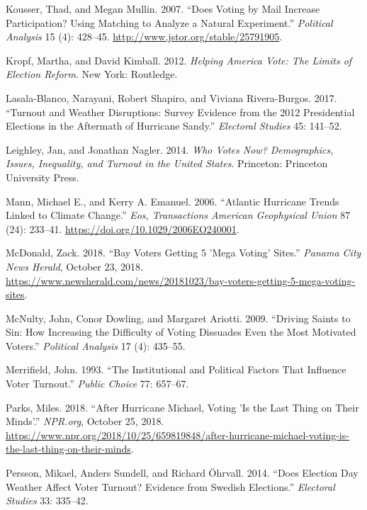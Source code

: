 \documentclass[
  12pt,
]{article}
\newlength{\cslhangindent}
\newenvironment{cslreferences}%
  {\setlength{\parindent}{0pt}%
  \everypar{\setlength{\hangindent}{\cslhangindent}}\ignorespaces}%
  {\par}
\begin{document}
\begin{cslreferences}
\leavevmode\hypertarget{ref-Kousser2007}{}%
Kousser, Thad, and Megan Mullin. 2007. ``Does Voting by Mail Increase Participation? Using Matching to Analyze a Natural Experiment.'' \emph{Political Analysis} 15 (4): 428--45. \url{http://www.jstor.org/stable/25791905}.

\leavevmode\hypertarget{ref-Kropf2012}{}%
Kropf, Martha, and David Kimball. 2012. \emph{Helping America Vote: The Limits of Election Reform}. New York: Routledge.

\leavevmode\hypertarget{ref-Lasala-Blanco2017}{}%
Lasala-Blanco, Narayani, Robert Shapiro, and Viviana Rivera-Burgos. 2017. ``Turnout and Weather Disruptions: Survey Evidence from the 2012 Presidential Elections in the Aftermath of Hurricane Sandy.'' \emph{Electoral Studies} 45: 141--52.

\leavevmode\hypertarget{ref-Leighley2014}{}%
Leighley, Jan, and Jonathan Nagler. 2014. \emph{Who Votes Now? Demographics, Issues, Inequality, and Turnout in the United States}. Princeton: Princeton University Press.

\leavevmode\hypertarget{ref-Mann2006}{}%
Mann, Michael E., and Kerry A. Emanuel. 2006. ``Atlantic Hurricane Trends Linked to Climate Change.'' \emph{Eos, Transactions American Geophysical Union} 87 (24): 233--41. \url{https://doi.org/10.1029/2006EO240001}.

\leavevmode\hypertarget{ref-McDonald2018}{}%
McDonald, Zack. 2018. ``Bay Voters Getting 5 'Mega Voting' Sites.'' \emph{Panama City News Herald}, October 23, 2018. \url{https://www.newsherald.com/news/20181023/bay-voters-getting-5-mega-voting-sites}.

\leavevmode\hypertarget{ref-McNulty2009}{}%
McNulty, John, Conor Dowling, and Margaret Ariotti. 2009. ``Driving Saints to Sin: How Increasing the Difficulty of Voting Dissuades Even the Most Motivated Voters.'' \emph{Political Analysis} 17 (4): 435--55.

\leavevmode\hypertarget{ref-Merrifield1993}{}%
Merrifield, John. 1993. ``The Institutional and Political Factors That Influence Voter Turnout.'' \emph{Public Choice} 77: 657--67.

\leavevmode\hypertarget{ref-Parks2018}{}%
Parks, Miles. 2018. ``After Hurricane Michael, Voting 'Is the Last Thing on Their Minds'.'' \emph{NPR.org}, October 25, 2018. \url{https://www.npr.org/2018/10/25/659819848/after-hurricane-michael-voting-is-the-last-thing-on-their-minds}.

\leavevmode\hypertarget{ref-Persson2014}{}%
Persson, Mikael, Anders Sundell, and Richard Öhrvall. 2014. ``Does Election Day Weather Affect Voter Turnout? Evidence from Swedish Elections.'' \emph{Electoral Studies} 33: 335--42.


\end{cslreferences}
\end{document}

